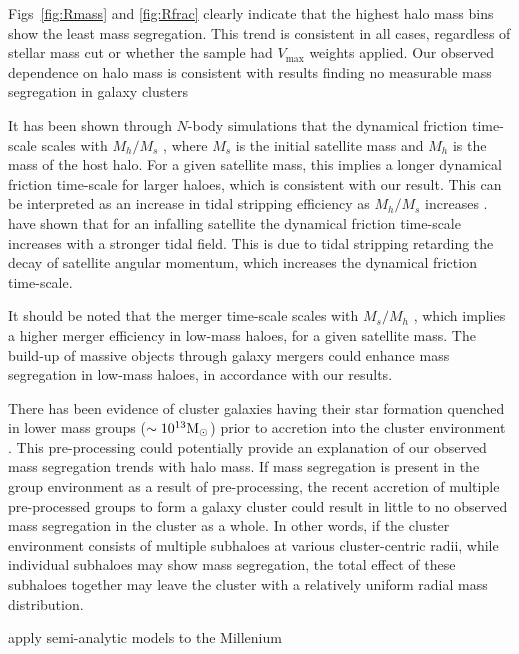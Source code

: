 Figs~\ref{fig:Rmass} and \ref{fig:Rfrac} clearly indicate that the
highest halo mass bins show the least mass segregation.  This trend is
consistent in all cases, regardless of stellar mass cut or whether the
sample had $V_\mathrm{max}$ weights applied.  Our observed dependence
on halo mass is consistent with results finding no measurable mass
segregation in galaxy clusters \citep{pracy2005, vonderlinden2010,
  vulcani2013}
\par
It has been shown through $N$-body simulations that the dynamical
friction time-scale scales with $M_h/M_s$ \citep[e.g.][]{taffoni2003,
  conroy2007, boylan2008}, where $M_s$ is the initial satellite mass
and $M_h$ is the mass of the host halo.  For a given satellite mass,
this implies a longer dynamical friction time-scale for larger haloes,
which is consistent with our result.  This can be interpreted as an
increase in tidal stripping efficiency as $M_h / M_s$ increases
\citep{taffoni2003}.  \citet{gan2010} have shown that for an infalling
satellite the dynamical friction time-scale increases with a stronger
tidal field.  This is due to tidal stripping retarding the decay of
satellite angular momentum, which increases the dynamical friction
time-scale.
\par
It should be noted that the merger time-scale scales with $M_s / M_h$
\citet{jiang2008}, which implies a higher merger efficiency in
low-mass haloes, for a given satellite mass.  The build-up of massive
objects through galaxy mergers could enhance mass segregation in
low-mass haloes, in accordance with our results.
\par
There has been evidence of cluster galaxies having their star
formation quenched in lower mass groups ($\sim 10^{13}\mathrm{M_{\odot}}$) prior to
accretion into the cluster environment \citep[e.g.][]{zabludoff1998,
  mcgee2009, delucia2012, hou2014}.  This pre-processing could
potentially provide an explanation of our observed mass segregation
trends with halo mass.  If mass segregation is present in the group
environment as a result of pre-processing, the recent accretion of
multiple pre-processed groups to form a galaxy cluster could result in
little to no observed mass segregation in the cluster as a whole.  In
other words, if the cluster environment consists of multiple subhaloes
at various cluster-centric radii, while individual subhaloes may show
mass segregation, the total effect of these subhaloes together may
leave the cluster with a relatively uniform radial mass distribution.
\par
\citet{vulcani2014} apply semi-analytic models to the Millenium
